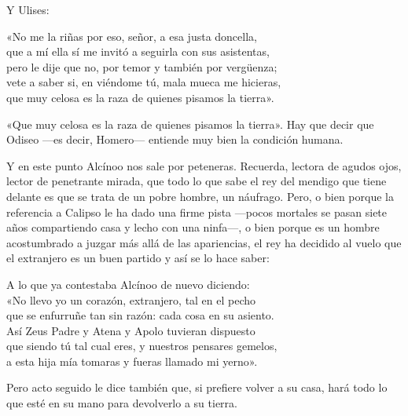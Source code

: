 Y Ulises:

\begin{versocita}
«No me la riñas por eso, señor, a esa justa doncella,\\
que a mí ella sí me invitó a seguirla con sus asistentas,\\
pero le dije que no, por temor y también por vergüenza;\\
vete a saber si, en viéndome tú, mala mueca me hicieras,\\
que muy celosa es la raza de quienes pisamos la tierra».
\end{versocita}

«Que muy celosa es la raza de quienes pisamos la tierra». Hay que decir que Odiseo ---es decir, Homero--- entiende muy bien la condición humana.

Y en este punto Alcínoo nos sale por peteneras. Recuerda, lectora de agudos ojos, lector de penetrante mirada, que todo lo que sabe el rey del mendigo que tiene delante es que se trata de un pobre hombre, un náufrago. Pero, o bien porque la referencia a Calipso le ha dado una firme pista ---pocos mortales se pasan siete años compartiendo casa y lecho con una ninfa---, o bien porque es un hombre acostumbrado a juzgar más allá de las apariencias, el rey ha decidido al vuelo que el extranjero es un buen partido y así se lo hace saber:

\begin{versocita}
A lo que ya contestaba Alcínoo de nuevo diciendo:\\
«No llevo yo un corazón, extranjero, tal en el pecho\\
que se enfurruñe tan sin razón: cada cosa en su asiento.\\
Así Zeus Padre y Atena y Apolo tuvieran dispuesto\\
que siendo tú tal cual eres, y nuestros pensares gemelos,\\
a esta hija mía tomaras y fueras llamado mi yerno».
\end{versocita}

Pero acto seguido le dice también que, si prefiere volver a su casa, hará todo lo que esté en su mano para devolverlo a su tierra.

